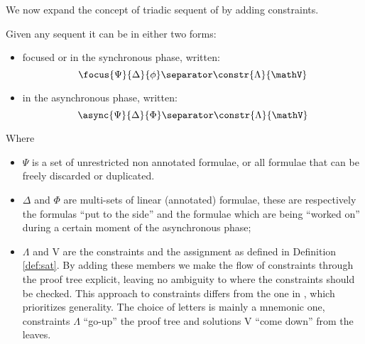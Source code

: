 We now expand the concept of triadic sequent of \cite{Focusing} by adding constraints.
\begin{define}
	Given any sequent it can be in either two forms:
	\begin{itemize}
		\item focused or in the synchronous phase, written:
			$$\focus{\Psi}{\Delta}{\phi} \separator \constr{\Lambda}{\mathV}$$
		\item in the asynchronous phase, written:
			$$\async{\Psi}{\Delta}{\Phi} \separator \constr{\Lambda}{\mathV}$$
	\end{itemize}
	Where 
	\begin{itemize}
		\item $\Psi$ is a set of unrestricted non annotated formulae, or all formulae that can be freely discarded or duplicated.
		\item $\Delta$ and $\Phi$ are multi-sets of linear (annotated) formulae, these are respectively the formulas ``put to the side'' and the formulae which are being ``worked on'' during a certain moment of the asynchronous phase;
		\item $\Lambda$ and V are the constraints and the assignment as defined in Definition \ref{def:sat}.
			By adding these members we make the flow of constraints through the proof tree explicit, leaving no ambiguity to where the constraints should be checked.
			This approach to constraints differs from the one in \cite{HarlandPym}, which prioritizes generality.
			The choice of letters is mainly a mnemonic one, constraints $\Lambda$ ``go-up'' the proof tree and solutions V ``come down'' from the leaves.
	\end{itemize}
\end{define}

